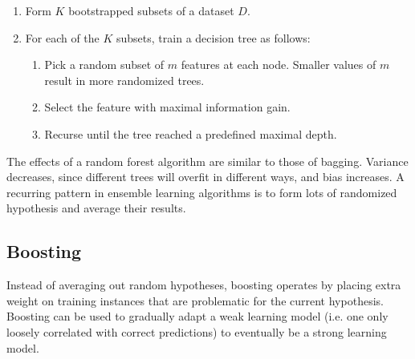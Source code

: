 \documentclass[12pt,titlepage]{article}
\begin{document}
      \begin{enumerate}
        \item Form $K$ bootstrapped subsets of a dataset $D$.
        \item For each of the $K$ subsets, train a decision tree as follows:
        \begin{enumerate}
          \item Pick a random subset of $m$ features at each node. Smaller values of $m$ result in more randomized trees.
          \item Select the feature with maximal information gain.
          \item Recurse until the tree reached a predefined maximal depth.
        \end{enumerate}
      \end{enumerate}

      The effects of a random forest algorithm are similar to those of bagging. Variance decreases, since different trees will overfit in different ways,
      and bias increases. A recurring pattern in ensemble learning algorithms is to form lots of randomized hypothesis and average their results.

    \subsection{Boosting}
      Instead of averaging out random hypotheses, boosting operates by placing extra weight on training instances that are problematic for the current
      hypothesis. Boosting can be used to gradually adapt a weak learning model (i.e. one only loosely correlated with correct predictions) to eventually
      be a strong learning model.
\end{document}
